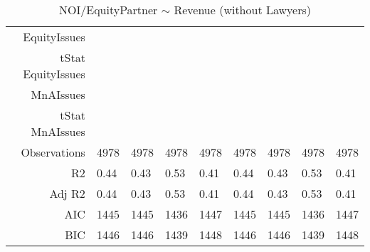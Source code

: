 \begin{table}[ht]
\begin{tabular}{rllllllll}
  EquityIssues &  &  &  &  &  &  &  &  \\ 
  tStat EquityIssues &  &  &  &  &  &  &  &  \\ 
  MnAIssues &  &  &  &  &  &  &  &  \\ 
  tStat MnAIssues &  &  &  &  &  &  &  &  \\ 
  Observations & 4978 & 4978 & 4978 & 4978 & 4978 & 4978 & 4978 & 4978 \\ 
  R2 & 0.44 & 0.43 & 0.53 & 0.41 & 0.44 & 0.43 & 0.53 & 0.41 \\ 
  Adj R2 & 0.44 & 0.43 & 0.53 & 0.41 & 0.44 & 0.43 & 0.53 & 0.41 \\ 
  AIC & 1445 & 1445 & 1436 & 1447 & 1445 & 1445 & 1436 & 1447 \\ 
  BIC & 1446 & 1446 & 1439 & 1448 & 1446 & 1446 & 1439 & 1448 \\ 
   \hline
\end{tabular}
\caption{NOI/EquityPartner $\sim$ Revenue (without Lawyers)} 
\end{table}
